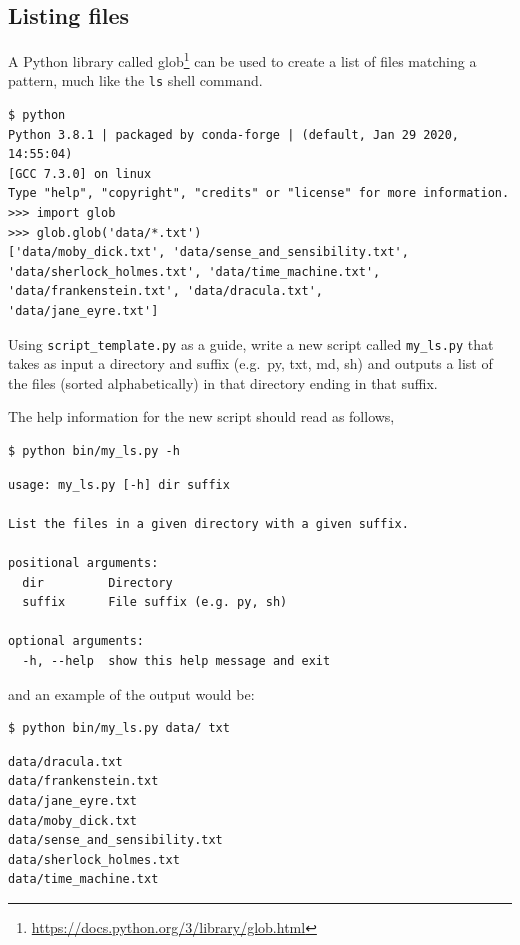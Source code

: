 \documentclass[
]{krantz}
\renewcommand{\href}[2]{#2\footnote{\url{#1}}}
\begin{document}
\hypertarget{scripting-ex-glob-ls}{%
\subsection{Listing files}\label{scripting-ex-glob-ls}}

A Python library called \href{https://docs.python.org/3/library/glob.html}{glob} can be used to create a list of files
matching a pattern, much like the \texttt{ls} shell command.

\begin{verbatim}
$ python
Python 3.8.1 | packaged by conda-forge | (default, Jan 29 2020, 14:55:04)
[GCC 7.3.0] on linux
Type "help", "copyright", "credits" or "license" for more information.
>>> import glob
>>> glob.glob('data/*.txt')
['data/moby_dick.txt', 'data/sense_and_sensibility.txt',
'data/sherlock_holmes.txt', 'data/time_machine.txt',
'data/frankenstein.txt', 'data/dracula.txt',
'data/jane_eyre.txt']
\end{verbatim}

Using \texttt{script\_template.py} as a guide,
write a new script called \texttt{my\_ls.py}
that takes as input a directory and suffix (e.g.~py, txt, md, sh)
and outputs a list of the files (sorted alphabetically)
in that directory ending in that suffix.

The help information for the new script should read as follows,

\begin{verbatim}
$ python bin/my_ls.py -h
\end{verbatim}

\begin{verbatim}
usage: my_ls.py [-h] dir suffix

List the files in a given directory with a given suffix.

positional arguments:
  dir         Directory
  suffix      File suffix (e.g. py, sh)

optional arguments:
  -h, --help  show this help message and exit
\end{verbatim}

and an example of the output would be:

\begin{verbatim}
$ python bin/my_ls.py data/ txt
\end{verbatim}

\begin{verbatim}
data/dracula.txt
data/frankenstein.txt
data/jane_eyre.txt
data/moby_dick.txt
data/sense_and_sensibility.txt
data/sherlock_holmes.txt
data/time_machine.txt
\end{verbatim}
\end{document}
